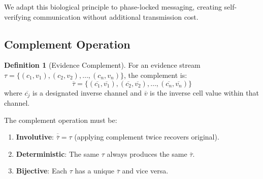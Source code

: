 \documentclass[twocolumn,10pt,a4paper]{article}
\theoremstyle{plain}
\theoremstyle{definition}
\newtheorem{definition}[theorem]{Definition}
\newcommand{\comp}[1]{\overline{#1}}
\begin{document}
We adapt this biological principle to phase-locked messaging, creating self-verifying communication without additional transmission cost.

\subsection{Complement Operation}

\begin{definition}[Evidence Complement]
For an evidence stream $\tau = \{(c_1, v_1), (c_2, v_2), \ldots, (c_n, v_n)\}$, the complement is:
\[
\comp{\tau} = \{(\comp{c_1}, \comp{v_1}), (\comp{c_2}, \comp{v_2}), \ldots, (\comp{c_n}, \comp{v_n})\}
\]
where $\comp{c_j}$ is a designated inverse channel and $\comp{v}$ is the inverse cell value within that channel.

The complement operation must be:
\begin{enumerate}
\item \textbf{Involutive}: $\comp{\comp{\tau}} = \tau$ (applying complement twice recovers original).
\item \textbf{Deterministic}: The same $\tau$ always produces the same $\comp{\tau}$.
\item \textbf{Bijective}: Each $\tau$ has a unique $\comp{\tau}$ and vice versa.
\end{enumerate}
\end{definition}
\end{document}
